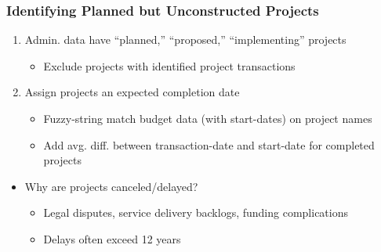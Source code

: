 \documentclass[aspectratio=149]{beamer}
\begin{document}
\begin{frame}

\end{frame}







\begin{frame}
\frametitle{Identifying Planned but Unconstructed Projects}

\begin{enumerate}
  \item Admin. data have ``planned,'' ``proposed,'' ``implementing'' projects
    \begin{itemize}
      \item Exclude projects with identified project transactions
    \end{itemize}

    \vspace{.2cm}

  \item Assign projects an expected completion date
    \begin{itemize}
      \item Fuzzy-string match budget data (with start-dates) on project names
      \item Add avg. diff. between transaction-date and start-date for completed projects
    \end{itemize}
\end{enumerate}

\begin{itemize}
  \item Why are projects canceled/delayed? 
    \begin{itemize}
      \item Legal disputes, service delivery backlogs, funding complications
      \item Delays often exceed 12 years 
    \end{itemize} 
\end{itemize}

\end{frame}
\end{document}
